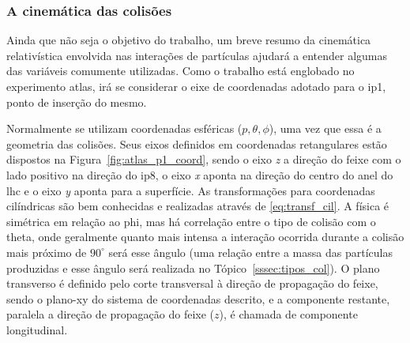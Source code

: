 \subsubsection{A cinemática das colisões}
\label{sssec:cinematica}

Ainda que não seja o objetivo do trabalho, um breve resumo da cinemática
relativística envolvida nas interações de partículas ajudará a entender algumas
das variáveis comumente utilizadas. 
Como o trabalho está englobado no experimento \gls{atlas}, irá se considerar o 
eixe de coordenadas adotado para o \gls{ip}1, ponto de inserção do mesmo. 


Normalmente se utilizam coordenadas esféricas ($p,\theta,\phi$), uma vez que 
essa é a geometria das colisões.
Seus eixos definidos em coordenadas retangulares estão dispostos 
na Figura~\ref{fig:atlas_p1_coord}, sendo o eixo \emph{z} a direção do feixe com
o lado positivo na direção do \gls{ip}8, o eixo
\emph{x} aponta na direção do centro do anel do \gls{lhc} e o eixo \emph{y}
aponta para a superfície.  
As transformações para coordenadas cilíndricas
são bem conhecidas e realizadas através de \ref{eq:transf_cil}.  
A física é simétrica em relação ao \gls{phi}, 
mas há correlação entre o
tipo de colisão com o \gls{theta}, onde geralmente quanto mais intensa a
interação ocorrida durante a colisão mais próximo de $90^\circ$ será esse
ângulo (uma relação entre a massa das partículas produzidas e esse ângulo
será realizada no Tópico~\ref{sssec:tipos_col}). O plano transverso é definido 
pelo corte transversal à direção de propagação do feixe, sendo o plano-xy do
sistema de coordenadas descrito, e a componente restante, paralela a direção de
propagação do feixe ($z$), é chamada de componente longitudinal.

